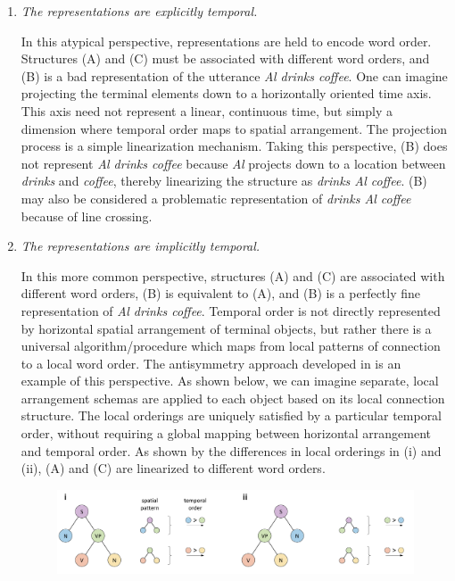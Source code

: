 \begin{enumerate}
\item \textit{The representations are explicitly temporal.}

  In this atypical perspective, representations are held to encode word order. Structures (A) and (C) must be associated with different word orders, and (B) is a bad representation of the utterance \textit{Al drinks coffee}. One can imagine projecting the terminal elements down to a horizontally oriented time axis. This axis need not represent a linear, continuous time, but simply a dimension where temporal order maps to spatial arrangement. The projection process is a simple linearization mechanism. Taking this perspective, (B) does not represent \textit{Al drinks coffee} because \textit{Al} projects down to a location between \textit{drinks} and \textit{coffee}, thereby linearizing the structure as \textit{drinks Al coffee}. (B) may also be considered a problematic representation of \textit{drinks Al coffee} because of line crossing.

\item \textit{The representations are implicitly temporal.}

  In this more common perspective, structures (A) and (C) are associated with different word orders, (B) is equivalent to (A), and (B) is a perfectly fine representation of \textit{Al drinks coffee}. Temporal order is not directly represented by horizontal spatial arrangement of terminal objects, but rather there is a universal algorithm/procedure which maps from local patterns of connection to a local word order. The antisymmetry approach developed in \citet{Kayne1994} is an example of this perspective. As shown below, we can imagine separate, local arrangement schemas are applied to each object based on its local connection structure. The local orderings are uniquely satisfied by a particular temporal order, without requiring a global mapping between horizontal arrangement and temporal order. As shown by the differences in local orderings in (i) and (ii), (A) and (C) are linearized to different word orders.

  
\begin{figure}
\includegraphics[width=\textwidth]{figures/Tilsen-img41.png}
\caption{\missingcaption}
\label{fig:3:13}
\end{figure}
 


\end{enumerate}

